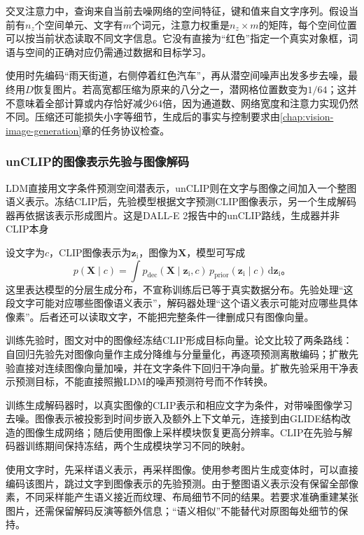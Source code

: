 交叉注意力中，查询来自当前去噪网络的空间特征，键和值来自文字序列。假设当前有$n_z$个空间单元、文字有$m$个词元，注意力权重是$n_z\times m$的矩阵，每个空间位置可以按当前状态读取不同文字信息。它没有直接为“红色”指定一个真实对象框，词语与空间的正确对应仍需通过数据和目标学习。

使用时先编码“雨天街道，右侧停着红色汽车”，再从潜空间噪声出发多步去噪，最终用$D$恢复图片。若高宽都压缩为原来的八分之一，潜网格位置数变为$1/64$；这并不意味着全部计算或内存恰好减少64倍，因为通道数、网络宽度和注意力实现仍然不同。压缩还可能损失小字等细节，生成后的事实与控制要求由\ref{chap:vision-image-generation}章的任务协议检查。

\subsubsection{unCLIP的图像表示先验与图像解码}
\label{sec:vision-models-unclip}

LDM直接用文字条件预测空间潜表示，unCLIP则在文字与图像之间加入一个整图语义表示。冻结CLIP后，先验模型根据文字预测CLIP图像表示，另一个生成解码器再依据该表示形成图片。这是DALL-E 2报告中的unCLIP路线，生成器并非CLIP本身

设文字为$c$，CLIP图像表示为$\bm z_{\mathrm i}$，图像为$\bm X$，模型可写成
\begin{equation}
  p(\bm X\mid c)
  =\int p_{\mathrm{dec}}(\bm X\mid\bm z_{\mathrm i},c)\,
          p_{\mathrm{prior}}(\bm z_{\mathrm i}\mid c)\,
          \mathrm d\bm z_{\mathrm i}\text{。}
  \label{eq:vision-unclip-factorization}
\end{equation}
这里表达模型的分层生成分布，不宣称训练后已等于真实数据分布。先验处理“这段文字可能对应哪些图像语义表示”，解码器处理“这个语义表示可能对应哪些具体像素”。后者还可以读取文字，不能把完整条件一律删成只有图像向量。

训练先验时，图文对中的图像经冻结CLIP形成目标向量。论文比较了两条路线：自回归先验先对图像向量作主成分降维与分量量化，再逐项预测离散编码；扩散先验直接对连续图像向量加噪，并在文字条件下回归干净向量。扩散先验采用干净表示预测目标，不能直接照搬LDM的噪声预测符号而不作转换。

训练生成解码器时，以真实图像的CLIP表示和相应文字为条件，对带噪图像学习去噪。图像表示被投影到时间步嵌入及额外上下文单元，连接到由GLIDE结构改造的图像生成网络；随后使用图像上采样模块恢复更高分辨率。CLIP在先验与解码器训练期间保持冻结，两个生成模块学习不同的映射。

使用文字时，先采样语义表示，再采样图像。使用参考图片生成变体时，可以直接编码该图片，跳过文字到图像表示的先验预测。由于整图语义表示没有保留全部像素，不同采样能产生语义接近而纹理、布局细节不同的结果。若要求准确重建某张图片，还需保留解码反演等额外信息；“语义相似”不能替代对原图每处细节的保持。

